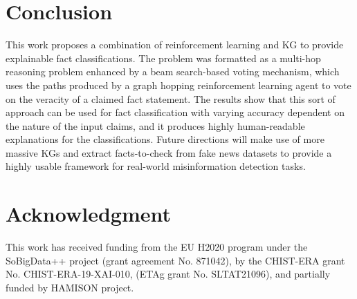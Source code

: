 \section{Conclusion}\label{conclusion}
This work proposes a combination of reinforcement learning and KG to provide explainable fact classifications. The problem was formatted as a multi-hop reasoning problem enhanced by a beam search-based voting mechanism, which uses the paths produced by a graph hopping reinforcement learning agent to vote on the veracity of a claimed fact statement.
The results show that this sort of approach can be used for fact classification with varying accuracy dependent on the nature of the input claims, and it produces highly human-readable explanations for the classifications.
Future directions will make use of more massive KGs and extract facts-to-check from fake news datasets to provide a highly usable framework for real-world misinformation detection tasks.

    
\section{Acknowledgment}
This work has received funding from the EU H2020 program under the SoBigData++ project (grant agreement No. 871042), by the CHIST-ERA grant No. CHIST-ERA-19-XAI-010,  (ETAg grant No. SLTAT21096), and partially funded by HAMISON project. %

